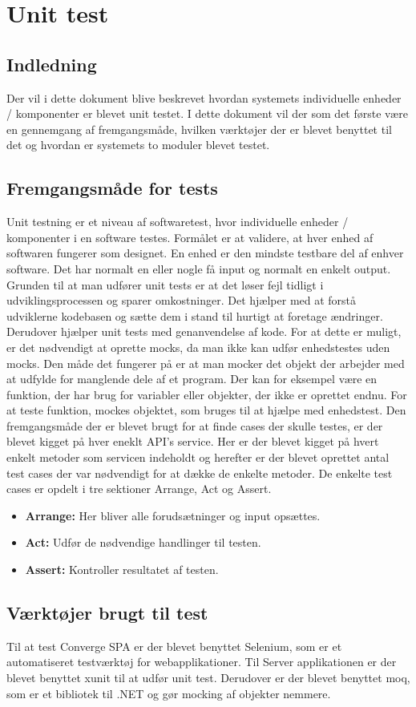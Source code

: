 \chapter{Unit test}

\section{Indledning}
Der vil i dette dokument blive beskrevet hvordan systemets individuelle enheder / komponenter er blevet unit testet. I dette dokument vil der som det første være en gennemgang af fremgangsmåde, hvilken værktøjer der er blevet benyttet til det og hvordan er systemets to moduler blevet testet. 

\section{Fremgangsmåde for tests}

Unit testning er et niveau af softwaretest, hvor individuelle enheder / komponenter i en software testes. Formålet er at validere, at hver enhed af softwaren fungerer som designet. En enhed er den mindste testbare del af enhver software. Det har normalt en eller nogle få input og normalt en enkelt output. Grunden til at man udfører unit tests er at det løser fejl tidligt i udviklingsprocessen og sparer omkostninger. Det hjælper med at forstå udviklerne kodebasen og sætte dem i stand til hurtigt at foretage ændringer. Derudover hjælper unit tests med genanvendelse af kode.
For at dette er muligt, er det nødvendigt at oprette mocks, da man ikke kan udfør enhedstestes uden mocks. Den måde det fungerer på er at man mocker det objekt der arbejder med at udfylde for manglende dele af et program. Der kan for eksempel være en funktion, der har brug for variabler eller objekter, der ikke er oprettet endnu. For at teste funktion, mockes objektet, som bruges til at hjælpe med enhedstest.
Den fremgangsmåde der er blevet brugt for at finde cases der skulle testes, er der blevet kigget på hver eneklt API’s service. Her er der blevet kigget på hvert enkelt metoder som servicen indeholdt og herefter er der blevet oprettet antal test cases der var nødvendigt for at dække de enkelte metoder. De enkelte test cases er opdelt i tre sektioner Arrange, Act og Assert. 
\begin{itemize}
    \item \textbf{Arrange:}  Her bliver alle forudsætninger og input opsættes.
    \item \textbf{Act:} Udfør de nødvendige handlinger til testen. 
    \item \textbf{Assert:} Kontroller resultatet af testen.
    
\end{itemize}


\section{Værktøjer brugt til test}

Til at test Converge SPA er der blevet benyttet Selenium, som er et automatiseret testværktøj for webapplikationer.  Til Server applikationen er der blevet benyttet xunit til at udfør unit test. Derudover er der blevet benyttet moq, som er et bibliotek til .NET og gør mocking af objekter nemmere. 